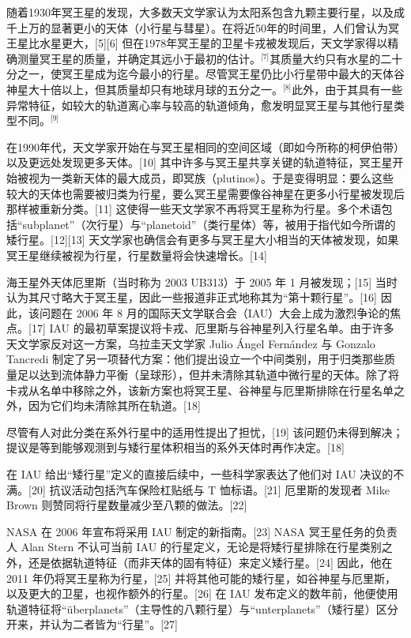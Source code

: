 随着1930年冥王星的发现，大多数天文学家认为太阳系包含九颗主要行星，以及成千上万的显著更小的天体（小行星与彗星）。在将近50年的时间里，人们曾认为冥王星比水星更大，[5][6] 但在1978年冥王星的卫星卡戎被发现后，天文学家得以精确测量冥王星的质量，并确定其远小于最初的估计。\(^\text{[7]}\)其质量大约只有水星的二十分之一，使冥王星成为迄今最小的行星。尽管冥王星仍比小行星带中最大的天体谷神星大十倍以上，但其质量却只有地球月球的五分之一。\(^\text{[8]}\)此外，由于其具有一些异常特征，如较大的轨道离心率与较高的轨道倾角，愈发明显冥王星与其他行星类型不同。\(^\text{[9]}\)

在1990年代，天文学家开始在与冥王星相同的空间区域（即如今所称的柯伊伯带）以及更远处发现更多天体。[10] 其中许多与冥王星共享关键的轨道特征，冥王星开始被视为一类新天体的最大成员，即冥族（plutinos）。于是变得明显：要么这些较大的天体也需要被归类为行星，要么冥王星需要像谷神星在更多小行星被发现后那样被重新分类。[11] 这使得一些天文学家不再将冥王星称为行星。多个术语包括“subplanet”（次行星）与“planetoid”（类行星体）等，被用于指代如今所谓的矮行星。[12][13] 天文学家也确信会有更多与冥王星大小相当的天体被发现，如果冥王星继续被视为行星，行星数量将会快速增长。[14]

海王星外天体厄里斯（当时称为 2003 UB313）于 2005 年 1 月被发现；[15] 当时认为其尺寸略大于冥王星，因此一些报道非正式地称其为“第十颗行星”。[16] 因此，该问题在 2006 年 8 月的国际天文学联合会（IAU）大会上成为激烈争论的焦点。[17] IAU 的最初草案提议将卡戎、厄里斯与谷神星列入行星名单。由于许多天文学家反对这一方案，乌拉圭天文学家 Julio Ángel Fernández 与 Gonzalo Tancredi 制定了另一项替代方案：他们提出设立一个中间类别，用于归类那些质量足以达到流体静力平衡（呈球形），但并未清除其轨道中微行星的天体。除了将卡戎从名单中移除之外，该新方案也将冥王星、谷神星与厄里斯排除在行星名单之外，因为它们均未清除其所在轨道。[18]

尽管有人对此分类在系外行星中的适用性提出了担忧，[19] 该问题仍未得到解决；提议是等到能够观测到与矮行星体积相当的系外天体时再作决定。[18]

在 IAU 给出“矮行星”定义的直接后续中，一些科学家表达了他们对 IAU 决议的不满。[20] 抗议活动包括汽车保险杠贴纸与 T 恤标语。[21] 厄里斯的发现者 Mike Brown 则赞同将行星数量减少至八颗的做法。[22]

NASA 在 2006 年宣布将采用 IAU 制定的新指南。[23] NASA 冥王星任务的负责人 Alan Stern 不认可当前 IAU 的行星定义，无论是将矮行星排除在行星类别之外，还是依据轨道特征（而非天体的固有特征）来定义矮行星。[24] 因此，他在 2011 年仍将冥王星称为行星，[25] 并将其他可能的矮行星，如谷神星与厄里斯，以及更大的卫星，也视作额外的行星。[26] 在 IAU 发布定义的数年前，他便使用轨道特征将“überplanets”（主导性的八颗行星）与“unterplanets”（矮行星）区分开来，并认为二者皆为“行星”。[27]
